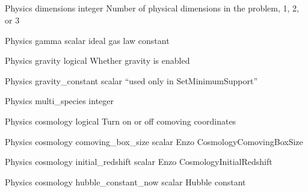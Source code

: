 \documentclass{article}
\begin{document}
\subsection{}

 	 	 	 	
\Parameter
{Physics}
{}
{dimensions}
{integer}
{}
{Number of physical dimensions in the problem, 1, 2, or 3}
{}
{}

\Parameter
{Physics}
{}
{gamma}
{scalar}
{}
{ideal gas law constant}
{}
{}

\Parameter
{Physics}
{}
{gravity}
{logical}
{}
{Whether gravity is enabled}
{}
{}

\Parameter
{Physics}
{}
{gravity\_constant}
{scalar}
{}
{``used only in SetMinimumSupport''}
{}
{}

\Parameter
{Physics}
{}
{multi\_species}
{integer}
{}
{}
{}
{}

\Parameter
{Physics}
{}
{cosmology}
{logical}
{}
{Turn on or off comoving coordinates}
{}
{}

\Parameter
{Physics}
{cosmology}
{comoving\_box\_size}
{scalar}
{}
{Enzo CosmologyComovingBoxSize}
{}
{}
 	 	 	 	
\Parameter
{Physics}
{cosmology}
{initial\_redshift}
{scalar}
{}
{Enzo CosmologyInitialRedshift}
{}
{}
 		 	 	
\Parameter
{Physics}
{cosmology}
{hubble\_constant\_now}
{scalar}
{}
{Hubble constant}
{}
{}
\end{document}
